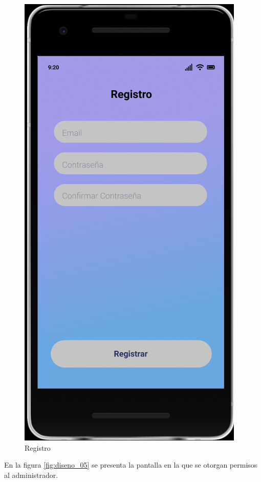 \documentclass{article}
\begin{document}
\begin{figure}[H]
    \centering
    \includegraphics[scale=0.7]{imgs/Figma/Registro2} 
    \caption{Registro}
    \label{fig:diseno_04}
\end{figure}

En la figura \ref{fig:diseno_05} se presenta la pantalla en la que se otorgan 
permisos al administrador.
\end{document}
